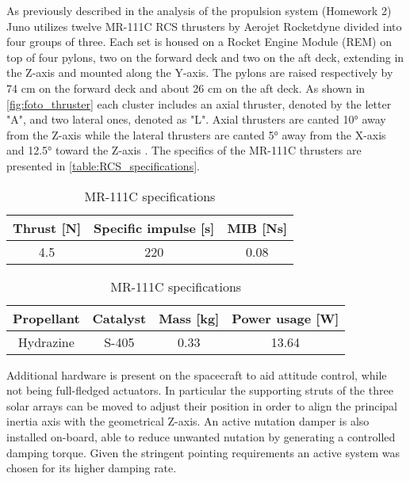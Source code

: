 As previously described in the analysis of the propulsion system (Homework 2) Juno utilizes twelve MR-111C RCS thrusters by Aerojet Rocketdyne \cite{RCS_info} divided into four groups of three. Each set is housed on a Rocket Engine Module (REM) on top of four pylons, two on the forward deck and two on the aft deck, extending in the Z-axis and mounted along the Y-axis. 
The pylons are raised respectively by 74 cm on the forward deck and about 26 cm on the aft deck. As shown in \autoref{fig:foto_thruster} each cluster includes an axial thruster, denoted by the letter "A", and two lateral ones, denoted as "L".
Axial thrusters are canted 10° away from the Z-axis while the lateral thrusters are canted 5° away from the X-axis and 12.5° toward the Z-axis \cite{juno_inner}. The specifics of the MR-111C thrusters are presented in \autoref{table:RCS_specifications}. \cite{RCS_values}

\begin{table}[H]
    \renewcommand{\arraystretch}{1.3}
    \centering
    \begin{tabular}{|c|c|c|}
        \hline
        \textbf{Thrust [N]} & \textbf{Specific impulse [s]} & \textbf{MIB [Ns]} \\
        \hline
        4.5 & 220 & 0.08 \\   
        \hline
    \end{tabular}

    \vspace{5mm}

    \begin{tabular}{|c|c|c|c|}
        \hline
        \textbf{Propellant} & \textbf{Catalyst} & \textbf{Mass [kg]} & \textbf{Power usage [W]}\\
        \hline
        Hydrazine & S-405 & 0.33 & 13.64 \\ 
        \hline
    \end{tabular}
    \caption{MR-111C specifications}
    \label{table:RCS_specifications}
\end{table}

Additional hardware is present on the spacecraft to aid attitude control, while not being full-fledged actuators. In particular the supporting struts of the three solar arrays can be moved to adjust their position in order to align the principal inertia axis with the geometrical Z-axis. An active nutation damper is also installed on-board, able to reduce unwanted nutation by generating a controlled damping torque. Given the stringent pointing requirements an active system was chosen for its higher damping rate.   

